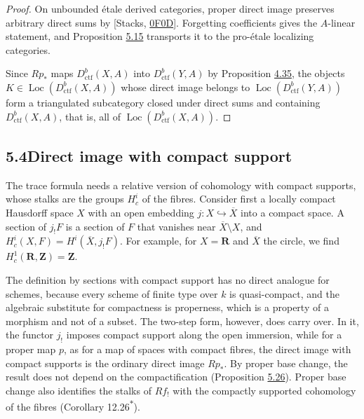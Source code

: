 \documentclass[11pt]{article}
\newcommand{\bpout}[1]{#1\textsuperscript{\hyperlink{bp-outside}{\ensuremath{\ast}}}}
\providecommand{\Loc}{}\renewcommand{\Loc}{\operatorname{Loc}}
\begin{document}
\begin{proof}[{Proof}]\label{bp458}%
On unbounded étale derived categories, proper direct image preserves arbitrary direct sums by [Stacks, \href{https://stacks.math.columbia.edu/tag/0F0D}{0F0D}]. Forgetting coefficients gives the \(A\)-linear statement, and Proposition \hyperref[bp454]{5.15} transports it to the pro-étale localizing categories.

Since \(Rp_*\) maps \(D^b_{\mathrm{ctf}}(X,A)\) into \(D^b_{\mathrm{ctf}}(Y,A)\) by Proposition \hyperref[bp390]{4.35}, the objects \(K\in\Loc(D^b_{\mathrm{ctf}}(X,A))\) whose direct image belongs to \(\Loc(D^b_{\mathrm{ctf}}(Y,A))\) form a triangulated subcategory closed under direct sums and containing \(D^b_{\mathrm{ctf}}(X,A)\), that is, all of \(\Loc(D^b_{\mathrm{ctf}}(X,A))\).
\end{proof}


\subsection*{\texorpdfstring{5.4\quad Direct image with compact support}{5.4 Direct image with compact support}}
\label{bp459}%
\label{bp460}%
The trace formula needs a relative version of cohomology with compact supports, whose stalks are the groups \(H^i_c\) of the fibres. Consider first a locally compact Hausdorff space \(X\) with an open embedding \(j:X\hookrightarrow\overline X\) into a compact space. A section of \(j_!F\) is a section of \(F\) that vanishes near \(\overline X\setminus X\), and \(H^i_c(X,F)=H^i(\overline X,j_!F)\). For example, for \(X=\mathbf R\) and \(\overline X\) the circle, we find \(H^1_c(\mathbf R,\mathbf Z)=\mathbf Z\).

The definition by sections with compact support has no direct analogue for schemes, because every scheme of finite type over \(k\) is quasi-compact, and the algebraic substitute for compactness is properness, which is a property of a morphism and not of a subset. The two-step form, however, does carry over. In it, the functor \(j_!\) imposes compact support along the open immersion, while for a proper map \(p\), as for a map of spaces with compact fibres, the direct image with compact supports is the ordinary direct image \(Rp_*\). By proper base change, the result does not depend on the compactification (Proposition \hyperref[bp492]{5.26}). Proper base change also identifies the stalks of \(Rf_!\) with the compactly supported cohomology of the fibres (Corollary \bpout{12.26}).
\end{document}
